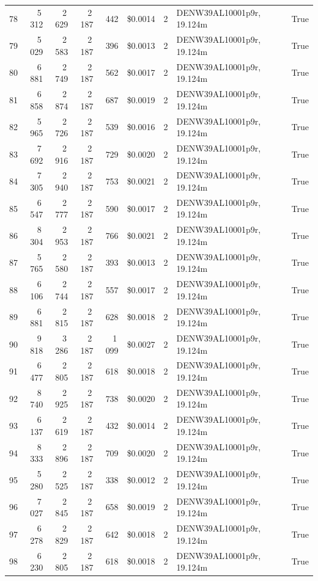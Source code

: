 \documentclass[a4paper,11pt]{article}
\begin{document}
\begin{table}[ht]
\begin{tabular}{r r r r r r r p{3cm} l}
78 & 5\,312 & 2\,629 & 2\,187 & 442 & \$0.0014 & 2 & DENW39AL10001p9r, 19.124m & True \\
79 & 5\,029 & 2\,583 & 2\,187 & 396 & \$0.0013 & 2 & DENW39AL10001p9r, 19.124m & True \\
80 & 6\,881 & 2\,749 & 2\,187 & 562 & \$0.0017 & 2 & DENW39AL10001p9r, 19.124m & True \\
81 & 6\,858 & 2\,874 & 2\,187 & 687 & \$0.0019 & 2 & DENW39AL10001p9r, 19.124m & True \\
82 & 5\,965 & 2\,726 & 2\,187 & 539 & \$0.0016 & 2 & DENW39AL10001p9r, 19.124m & True \\
83 & 7\,692 & 2\,916 & 2\,187 & 729 & \$0.0020 & 2 & DENW39AL10001p9r, 19.124m & True \\
84 & 7\,305 & 2\,940 & 2\,187 & 753 & \$0.0021 & 2 & DENW39AL10001p9r, 19.124m & True \\
85 & 6\,547 & 2\,777 & 2\,187 & 590 & \$0.0017 & 2 & DENW39AL10001p9r, 19.124m & True \\
86 & 8\,304 & 2\,953 & 2\,187 & 766 & \$0.0021 & 2 & DENW39AL10001p9r, 19.124m & True \\
87 & 5\,765 & 2\,580 & 2\,187 & 393 & \$0.0013 & 2 & DENW39AL10001p9r, 19.124m & True \\
88 & 6\,106 & 2\,744 & 2\,187 & 557 & \$0.0017 & 2 & DENW39AL10001p9r, 19.124m & True \\
89 & 6\,881 & 2\,815 & 2\,187 & 628 & \$0.0018 & 2 & DENW39AL10001p9r, 19.124m & True \\
90 & 9\,818 & 3\,286 & 2\,187 & 1\,099 & \$0.0027 & 2 & DENW39AL10001p9r, 19.124m & True \\
91 & 6\,477 & 2\,805 & 2\,187 & 618 & \$0.0018 & 2 & DENW39AL10001p9r, 19.124m & True \\
92 & 8\,740 & 2\,925 & 2\,187 & 738 & \$0.0020 & 2 & DENW39AL10001p9r, 19.124m & True \\
93 & 6\,137 & 2\,619 & 2\,187 & 432 & \$0.0014 & 2 & DENW39AL10001p9r, 19.124m & True \\
94 & 8\,333 & 2\,896 & 2\,187 & 709 & \$0.0020 & 2 & DENW39AL10001p9r, 19.124m & True \\
95 & 5\,280 & 2\,525 & 2\,187 & 338 & \$0.0012 & 2 & DENW39AL10001p9r, 19.124m & True \\
96 & 7\,027 & 2\,845 & 2\,187 & 658 & \$0.0019 & 2 & DENW39AL10001p9r, 19.124m & True \\
97 & 6\,278 & 2\,829 & 2\,187 & 642 & \$0.0018 & 2 & DENW39AL10001p9r, 19.124m & True \\
98 & 6\,230 & 2\,805 & 2\,187 & 618 & \$0.0018 & 2 & DENW39AL10001p9r, 19.124m & True \\

\end{tabular}
\end{table}
\end{document}
